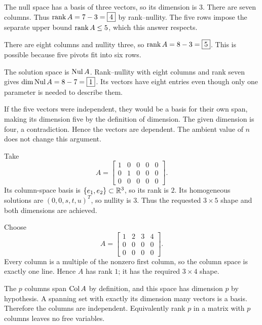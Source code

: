 The null space has a basis of three vectors, so its dimension is $3$.
There are seven columns. Thus $\operatorname{rank} A=7-3=\boxed4$ by rank--nullity.
The five rows impose the separate upper bound $\operatorname{rank} A\le5$, which this
answer respects.

There are eight columns and nullity three, so
$\operatorname{rank} A=8-3=\boxed5$. This is possible because five pivots fit into
six rows.

The solution space is $\operatorname{Nul} A$. Rank--nullity with eight columns and
rank seven gives $\dim\operatorname{Nul} A=8-7=\boxed1$.
Its vectors have eight entries even though only one parameter is needed
to describe them.

If the five vectors were independent, they would be a basis for their
own span, making its dimension five by the definition of dimension.
The given dimension is four, a contradiction. Hence the vectors are dependent.
The ambient value of $n$ does not change this argument.

Take
\[
 A=\begin{bmatrix}1&0&0&0&0\\0&1&0&0&0\\0&0&0&0&0\end{bmatrix}.
\]
Its column-space basis is $\{e_1,e_2\}\subset\mathbb{R}^3$, so its rank is $2$.
Its homogeneous solutions are $(0,0,s,t,u)^T$, so nullity is $3$.
Thus the requested $3\times5$ shape and both dimensions are achieved.

Choose
\[
 A=\begin{bmatrix}1&2&3&4\\0&0&0&0\\0&0&0&0\end{bmatrix}.
\]
Every column is a multiple of the nonzero first column, so the column space
is exactly one line. Hence $A$ has rank $1$; it has the required $3\times4$ shape.

The $p$ columns span $\operatorname{Col} A$ by definition, and this space has dimension
$p$ by hypothesis. A spanning set with exactly its dimension many vectors
is a basis. Therefore the columns are independent.
Equivalently rank $p$ in a matrix with $p$ columns leaves no free variables.

